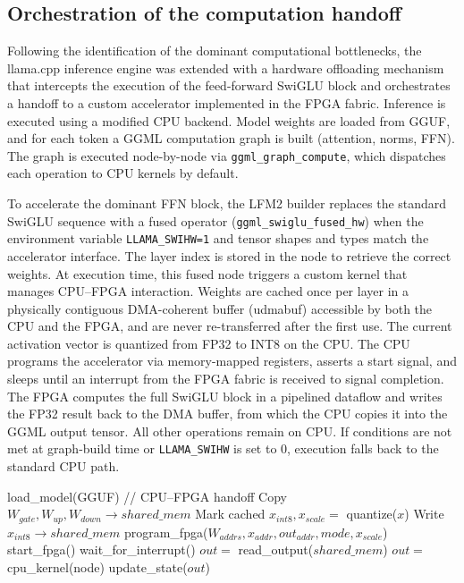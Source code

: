 \documentclass[conference]{IEEEtran}
\begin{document}
\subsection{Orchestration of the computation handoff}
Following the identification of the dominant computational bottlenecks, the llama.cpp inference engine was extended with a hardware offloading mechanism that intercepts the execution of the feed-forward SwiGLU block and orchestrates a handoff to a custom accelerator implemented in the FPGA fabric.
Inference is executed using a modified 
CPU backend. Model weights are loaded from GGUF, and for each token a GGML computation graph is built (attention, norms, FFN). The graph is executed node-by-node via \texttt{ggml\_graph\_compute}, which dispatches each operation to CPU kernels by default.

To accelerate the dominant FFN block, the LFM2 builder replaces the standard SwiGLU sequence with a fused operator (\texttt{ggml\_swiglu\_fused\_hw}) when the environment variable \texttt{LLAMA\_SWIHW=1} and tensor shapes and types match the accelerator interface. The layer index is stored in the node to retrieve the correct weights.
At execution time, this fused node triggers a custom kernel that manages CPU–FPGA interaction. Weights are cached once per layer in a physically contiguous DMA-coherent buffer (udmabuf) accessible by both the CPU and the FPGA, and are never re-transferred after the first use. The current activation vector is quantized from FP32 to INT8 on the CPU. %
The CPU programs the accelerator via memory-mapped registers, asserts a start signal, and sleeps until an interrupt from the FPGA fabric is received to signal completion. The FPGA computes the full SwiGLU block in a pipelined dataflow and writes the FP32 result back to the DMA buffer, from which the CPU copies it into the GGML output tensor. All other operations remain on CPU. If conditions are not met at graph-build time or \texttt{LLAMA\_SWIHW} is set to 0, execution falls back to the standard CPU path.

\begin{algorithm}[htb!]
\caption{LFM2 Inference Execution}
\begin{algorithmic}[1]

\STATE load\_model(GGUF)
            \STATE // CPU--FPGA handoff
                \STATE Copy $W_{gate}, W_{up}, W_{down} \rightarrow shared\_mem$
                \STATE Mark cached
            \ENDIF
            \STATE $x_{int8}, x_{scale} =$ quantize($x$)
            \STATE Write $x_{int8} \rightarrow shared\_mem$
            \STATE program\_fpga($W_{addrs}, x_{addr}, out_{addr}, mode, x_{scale}$)
            \STATE start\_fpga()
            \STATE wait\_for\_interrupt()
            \STATE $out =$ read\_output($shared\_mem$)
        \ELSE
            \STATE $out =$ cpu\_kernel(node)
        \ENDIF
    \ENDFOR
    \STATE update\_state($out$)
\ENDFOR
\end{algorithmic}
\end{algorithm}
\end{document}
